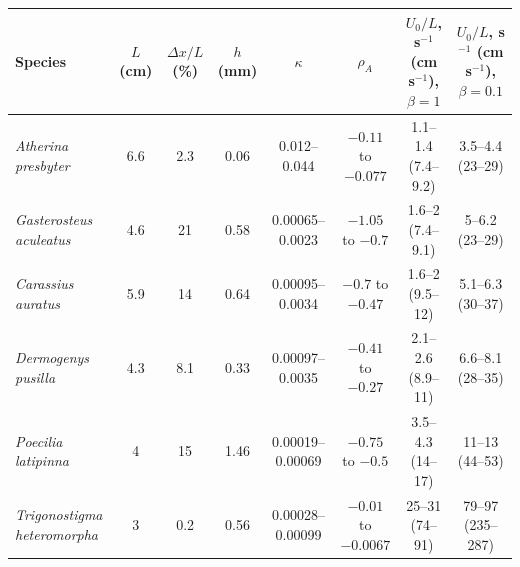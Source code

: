 \begin{tabular}{lccccccc}
\toprule
Species & $L$ (cm) & $\Delta x/L$ (\%) & $h$ (mm) & $\kappa$ & $\rho_A$ & $U_0/L$, s$^{-1}$ (cm s$^{-1}$), $\beta=1$ & $U_0/L$, s$^{-1}$ (cm s$^{-1}$), $\beta=0.1$ \\
\midrule
\emph{Atherina presbyter} & 6.6 & 2.3 & 0.06 & 0.012--0.044 & $-0.11$ to $-0.077$ & 1.1--1.4 (7.4--9.2) & 3.5--4.4 (23--29) \\
\emph{Gasterosteus aculeatus} & 4.6 & 21 & 0.58 & 0.00065--0.0023 & $-1.05$ to $-0.7$ & 1.6--2 (7.4--9.1) & 5--6.2 (23--29) \\
\emph{Carassius auratus} & 5.9 & 14 & 0.64 & 0.00095--0.0034 & $-0.7$ to $-0.47$ & 1.6--2 (9.5--12) & 5.1--6.3 (30--37) \\
\emph{Dermogenys pusilla} & 4.3 & 8.1 & 0.33 & 0.00097--0.0035 & $-0.41$ to $-0.27$ & 2.1--2.6 (8.9--11) & 6.6--8.1 (28--35) \\
\emph{Poecilia latipinna} & 4 & 15 & 1.46 & 0.00019--0.00069 & $-0.75$ to $-0.5$ & 3.5--4.3 (14--17) & 11--13 (44--53) \\
\emph{Trigonostigma heteromorpha} & 3 & 0.2 & 0.56 & 0.00028--0.00099 & $-0.01$ to $-0.0067$ & 25--31 (74--91) & 79--97 (235--287) \\
\bottomrule
\end{tabular}
